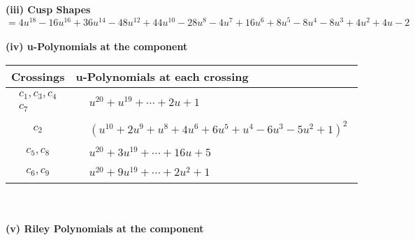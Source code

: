 \documentclass[1p]{elsarticle_modified}
\theoremstyle{definition}
\begin{document}
\flushleft \textbf{(iii) Cusp Shapes $= 4 u^{18}-16 u^{16}+36 u^{14}-48 u^{12}+44 u^{10}-28 u^8-4 u^7+16 u^6+8 u^5-8 u^4-8 u^3+4 u^2+4 u-2$}\\~\\
\newpage\renewcommand{\arraystretch}{1}
\flushleft \textbf{(iv) u-Polynomials at the component}\newline \\
\begin{tabular}{m{50pt}|m{274pt}}
Crossings & \hspace{64pt}u-Polynomials at each crossing \\
\hline $$\begin{aligned}c_{1},c_{3},c_{4}\\c_{7}\end{aligned}$$&$\begin{aligned}
&u^{20}+u^{19}+\cdots+2 u+1
\end{aligned}$\\
\hline $$\begin{aligned}c_{2}\end{aligned}$$&$\begin{aligned}
&(u^{10}+2 u^9+u^8+4 u^6+6 u^5+u^4-6 u^3-5 u^2+1)^2
\end{aligned}$\\
\hline $$\begin{aligned}c_{5},c_{8}\end{aligned}$$&$\begin{aligned}
&u^{20}+3 u^{19}+\cdots+16 u+5
\end{aligned}$\\
\hline $$\begin{aligned}c_{6},c_{9}\end{aligned}$$&$\begin{aligned}
&u^{20}+9 u^{19}+\cdots+2 u^2+1
\end{aligned}$\\
\hline
\end{tabular}\\~\\
\newpage\renewcommand{\arraystretch}{1}
\flushleft \textbf{(v) Riley Polynomials at the component}\newline \\
\end{document}
